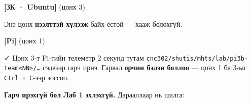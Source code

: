 \textbf{{[}ЗК · Ubuntu{]}} (цонх 3)

\begin{Shaded}
\begin{Highlighting}[]
\end{Highlighting}
\end{Shaded}

Энэ цонх \textbf{нээлттэй хүлээж} байх ёстой --- хааж болохгүй.

\textbf{{[}Pi{]}} (цонх 1)

\begin{Shaded}
\begin{Highlighting}[]
\KeywordTok{\&\&} 
\end{Highlighting}
\end{Shaded}

✓ Цонх 3-т Pi-гийн телеметр 2 секунд тутам \texttt{cnc302/\allowbreak{}shutis/\allowbreak{}mhts/\allowbreak{}lab/\allowbreak{}pi3b-team\textless{}NN\textgreater{}/\allowbreak{}\ldots{}} сэдвээр гарч ирнэ. Гарвал \textbf{орчин бэлэн боллоо} --- цонх 1 ба 3-ыг \texttt{Ctrl\ +\ C}-ээр зогсоо.

\textbf{Гарч ирэхгүй бол Лаб 1 эхлэхгүй.} Дарааллаар нь шалга:

